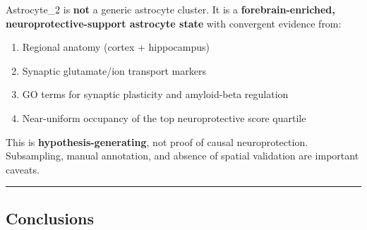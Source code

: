 \documentclass[
  11pt,
]{article}
\providecommand{\tightlist}{%
  \setlength{\itemsep}{0pt}\setlength{\parskip}{0pt}}
\begin{document}
\begin{tcolorbox}[enhanced jigsaw, arc=.35mm, bottomrule=.15mm, bottomtitle=1mm, breakable, colback=white, colbacktitle=quarto-callout-important-color!10!white, colframe=quarto-callout-important-color-frame, coltitle=black, left=2mm, leftrule=.75mm, opacityback=0, opacitybacktitle=0.6, rightrule=.15mm, title=\textcolor{quarto-callout-important-color}{\faExclamation}\hspace{0.5em}{Interpretation (professor's conclusion)}, titlerule=0mm, toprule=.15mm, toptitle=1mm]

Astrocyte\_2 is \textbf{not} a generic astrocyte cluster. It is a
\textbf{forebrain-enriched, neuroprotective-support astrocyte state}
with convergent evidence from:

\begin{enumerate}
\def\labelenumi{\arabic{enumi}.}
\tightlist
\item
  Regional anatomy (cortex + hippocampus)
\item
  Synaptic glutamate/ion transport markers
\item
  GO terms for synaptic plasticity and amyloid-beta regulation
\item
  Near-uniform occupancy of the top neuroprotective score quartile
\end{enumerate}

This is \textbf{hypothesis-generating}, not proof of causal
neuroprotection. Subsampling, manual annotation, and absence of spatial
validation are important caveats.

\end{tcolorbox}

\begin{center}\rule{0.5\linewidth}{0.5pt}\end{center}

\subsection{Conclusions}\label{conclusions}
\end{document}
